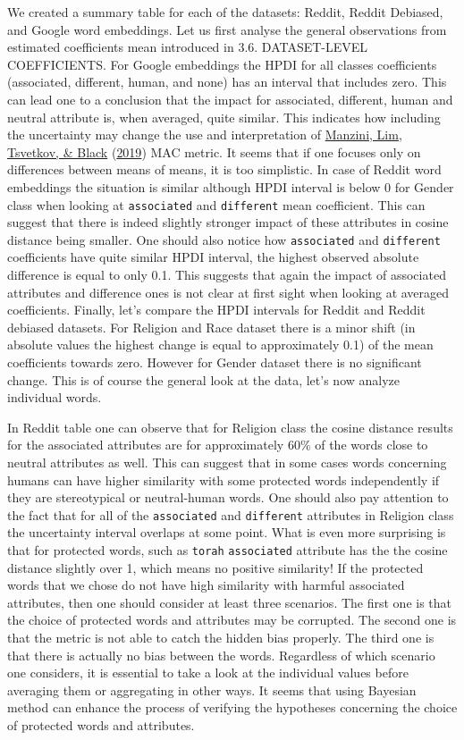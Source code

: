 \documentclass[
  12pt,
]{book}
\begin{document}
We created a summary table for each of the datasets: Reddit, Reddit Debiased, and Google word embeddings. Let us first analyse the general observations from estimated coefficients mean introduced in 3.6. DATASET-LEVEL COEFFICIENTS. For Google embeddings the HPDI for all classes coefficients (associated, different, human, and none) has an interval that includes zero. This can lead one to a conclusion that the impact for associated, different, human and neutral attribute is, when averaged, quite similar. This indicates how including the uncertainty may change the use and interpretation of \protect\hyperlink{ref-Manzini2019blackToCriminal}{Manzini, Lim, Tsvetkov, \& Black} (\protect\hyperlink{ref-Manzini2019blackToCriminal}{2019}) MAC metric. It seems that if one focuses only on differences between means of means, it is too simplistic. In case of Reddit word embeddings the situation is similar although HPDI interval is below 0 for Gender class when looking at \texttt{associated} and \texttt{different} mean coefficient. This can suggest that there is indeed slightly stronger impact of these attributes in cosine distance being smaller. One should also notice how \texttt{associated} and \texttt{different} coefficients have quite similar HPDI interval, the highest observed absolute difference is equal to only 0.1. This suggests that again the impact of associated attributes and difference ones is not clear at first sight when looking at averaged coefficients. Finally, let's compare the HPDI intervals for Reddit and Reddit debiased datasets. For Religion and Race dataset there is a minor shift (in absolute values the highest change is equal to approximately 0.1) of the mean coefficients towards zero. However for Gender dataset there is no significant change. This is of course the general look at the data, let's now analyze individual words.

In Reddit table one can observe that for Religion class the cosine distance results for the associated attributes are for approximately 60\% of the words close to neutral attributes as well. This can suggest that in some cases words concerning humans can have higher similarity with some protected words independently if they are stereotypical or neutral-human words. One should also pay attention to the fact that for all of the \texttt{associated} and \texttt{different} attributes in Religion class the uncertainty interval overlaps at some point. What is even more surprising is that for protected words, such as \texttt{torah} \texttt{associated} attribute has the the cosine distance slightly over 1, which means no positive similarity! If the protected words that we chose do not have high similarity with harmful associated attributes, then one should consider at least three scenarios. The first one is that the choice of protected words and attributes may be corrupted. The second one is that the metric is not able to catch the hidden bias properly. The third one is that there is actually no bias between the words. Regardless of which scenario one considers, it is essential to take a look at the individual values before averaging them or aggregating in other ways. It seems that using Bayesian method can enhance the process of verifying the hypotheses concerning the choice of protected words and attributes.
\end{document}
